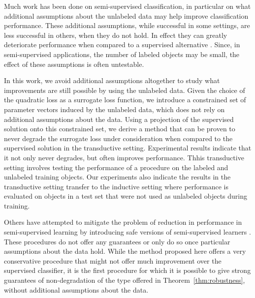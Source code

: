 \documentclass{article}
\begin{document}
Much work has been done on semi-supervised classification, in particular on what additional assumptions about the unlabeled data may help improve classification performance. These additional assumptions, while successful in some settings, are less successful in others, when they do not hold. In effect they can greatly deteriorate performance when compared to a supervised alternative \citep{Cozman2006}. Since, in semi-supervised applications, the number of labeled objects may be small, the effect of these assumptions is often untestable. 

In this work, we avoid additional assumptions altogether to study what improvements are still possible by using the unlabeled data. Given the choice of the quadratic loss as a surrogate loss function, we introduce a constrained set of parameter vectors induced by the unlabeled data, which does not rely on additional assumptions about the data. Using a projection of the supervised solution onto this constrained set, we derive a method that can be proven to never degrade the surrogate loss under consideration when compared to the supervised solution in the transductive setting. Experimental results indicate that it not only never degrades, but often improves performance. Thhis transductive setting involves testing the performance of a procedure on the labeled and unlabeled training objects. Our experiments also indicate the results in the transductive setting transfer to the inductive setting where performance is evaluated on objects in a test set that were not used as unlabeled objects during training.

Others have attempted to mitigate the problem of reduction in performance in semi-supervised learning by introducing safe versions of semi-supervised learners \citep{Li2011,Loog2010,Loog2014a}. These procedures do not offer any guarantees or only do so once particular assumptions about the data hold.
While the method proposed here offers a very conservative procedure that might not offer much improvement over the supervised classifier, it is the first procedure for which it is possible to give strong guarantees of non-degradation of the type offered in Theorem~\ref{thm:robustness}, without additional assumptions about the data. 

\end{document}
